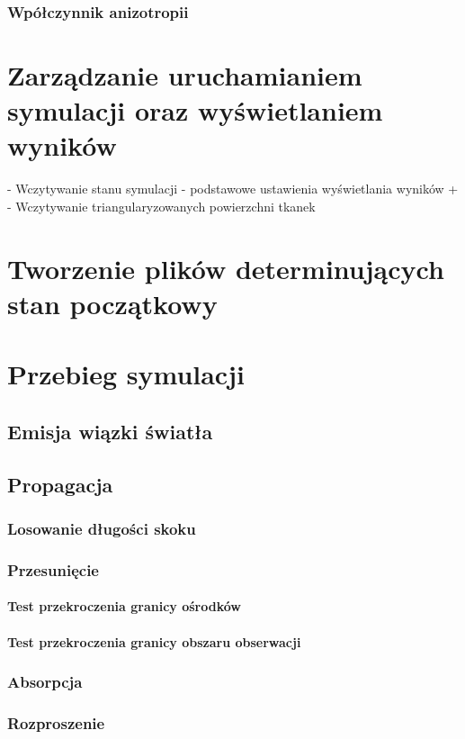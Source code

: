 \subsubsection{Wpółczynnik anizotropii}

\section{Zarządzanie uruchamianiem symulacji oraz wyświetlaniem wyników}
- Wczytywanie stanu symulacji
- podstawowe ustawienia wyświetlania wyników
+    - Wczytywanie triangularyzowanych powierzchni tkanek

\section{Tworzenie plików determinujących stan początkowy}

\section{Przebieg symulacji}
\subsection{Emisja wiązki światła}
\subsection{Propagacja}
\subsubsection{Losowanie długości skoku}
\subsubsection{Przesunięcie}
\paragraph{Test przekroczenia granicy ośrodków}
\paragraph{Test przekroczenia granicy obszaru obserwacji}
\subsubsection{Absorpcja}
\subsubsection{Rozproszenie}
